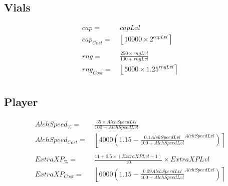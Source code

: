             \subsection{Vials}
            \begin{align*}
                cap =  &\ capLvl
                \\ 
                cap_{Cost} = &\ 
                    \left\lfloor 
                        10000 \times 2^{capLvl}
                    \right\rceil 
                \\ 
                \\
                rng = &\  \frac{250 \times rngLvl}{100+rngLvl}
                \\ 
                rng_{Cost} = &\ 
                    \left\lfloor 
                        5000 \times 1.25^{rngLvl}
                    \right\rceil 
                \\ 
            \end{align*}
        \subsection{Player}
            \begin{align*}
                AlchSpeed_\% = &\ \frac{35 \times AlchSpeedLvl}{100+AlchSpeedLvl} 
                \\ 
                AlchSpeed_{Cost} = &\ 
                    \left\lfloor 
                        4000\left(1.15-\frac{0.1AlchSpeedLvl}{100+AlchSpeedLvl}^{AlchSpeedLvl}\right) 
                    \right\rceil 
                \\ 
                \\
                ExtraXP_\% = &\ \frac{11 + 0.5 \times (ExtraXPLvl-1)}{10} \times ExtraXPLvl
                \\
                ExtraXP_{Cost} = &\ 
                \left\lfloor 
                    6000\left(1.15-\frac{0.09AlchSpeedLvl}{100+AlchSpeedLvl}^{AlchSpeedLvl}\right) 
                \right\rceil 
            \end{align*}
    
        \newpage
